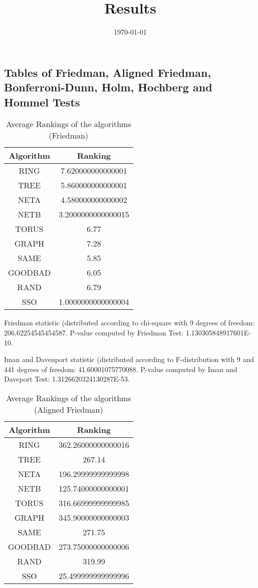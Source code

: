 \documentclass[a4paper,10pt]{article}
\title{Results}
\author{}
\date{\today}
\begin{document}
\begin{landscape}
\oddsidemargin 0in \topmargin 0in\maketitle
\section{Tables of Friedman, Aligned Friedman, Bonferroni-Dunn, Holm, Hochberg and Hommel Tests}
\begin{table}[!htp]
\centering
\caption{Average Rankings of the algorithms (Friedman)
}\begin{tabular}{c|c}
Algorithm&Ranking\\
\hline
 RING&7.620000000000001\\
 TREE&5.860000000000001\\
 NETA&4.580000000000002\\
 NETB&3.2000000000000015\\
 TORUS&6.77\\
 GRAPH&7.28\\
 SAME&5.85\\
 GOODBAD&6.05\\
 RAND&6.79\\
 SSO&1.0000000000000004\\
\end{tabular}
\end{table}


Friedman statistic (distributed according to chi-square with 9 degrees of freedom: 206.62254545454587. 
P-value computed by Friedman Test: 1.130305848917601E-10.\newline

Iman and Davenport statistic (distributed according to F-distribution with 9 and 441 degrees of freedom: 41.60001075770088. 
P-value computed by Iman and Daveport Test: 1.3126620324130287E-53.\newline


\newpage

\begin{table}[!htp]
\centering
\caption{Average Rankings of the algorithms (Aligned Friedman)
}\begin{tabular}{c|c}
Algorithm&Ranking\\
\hline
 RING&362.26000000000016\\
 TREE&267.14\\
 NETA&196.29999999999998\\
 NETB&125.74000000000001\\
 TORUS&316.66999999999985\\
 GRAPH&345.90000000000003\\
 SAME&271.75\\
 GOODBAD&273.75000000000006\\
 RAND&319.99\\
 SSO&25.499999999999996\\
\end{tabular}
\end{table}



\end{landscape}
\end{document}
